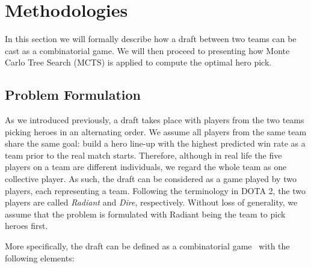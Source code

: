 



\section{Methodologies}\label{sec:methodologies}
In  this  section  we  will  formally  describe  how  a draft between two teams can be cast as a combinatorial game. We will then proceed to presenting how Monte Carlo Tree Search (MCTS) is applied to compute the optimal hero pick.



\subsection{Problem Formulation}\label{sec:probdef}
As we introduced previously, a draft takes place with players from the two teams picking heroes in an alternating order. We assume all players from the same team share the same goal: build a hero line-up with the highest predicted win rate as a team prior to the real match starts. Therefore, although in real life the five players on a team are different individuals, we regard the whole team as one collective player. As such, the draft can be considered as a game played by two players, each representing a team. Following the terminology in DOTA 2, the two players are called \textit{Radiant} and \textit{Dire}, respectively. Without loss of generality, we assume that the problem is formulated with Radiant being the team to pick heroes first. 

More specifically, the draft can be defined as a combinatorial game~\cite{browne2012survey} with the following elements:

